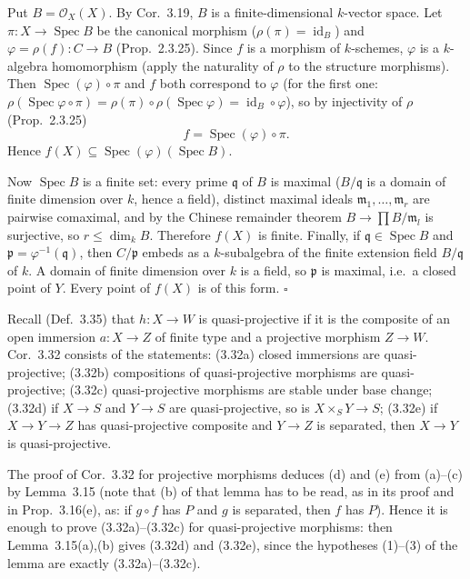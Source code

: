 \documentclass[11pt]{article}
\begin{document}
Put $B=\mathcal{O}_X(X)$. By Cor.~3.19, $B$ is a finite-dimensional $k$-vector space. Let $\pi:X\to\operatorname{Spec}B$ be the canonical morphism ($\rho(\pi)=\operatorname{id}_B$) and $\varphi=\rho(f):C\to B$ (Prop.~2.3.25). Since $f$ is a morphism of $k$-schemes, $\varphi$ is a $k$-algebra homomorphism (apply the naturality of $\rho$ to the structure morphisms). Then $\operatorname{Spec}(\varphi)\circ\pi$ and $f$ both correspond to $\varphi$ (for the first one: $\rho(\operatorname{Spec}\varphi\circ\pi)=\rho(\pi)\circ\rho(\operatorname{Spec}\varphi)=\operatorname{id}_B\circ\varphi$), so by injectivity of $\rho$ (Prop.~2.3.25)
\[ f=\operatorname{Spec}(\varphi)\circ\pi. \]
Hence $f(X)\subseteq\operatorname{Spec}(\varphi)(\operatorname{Spec}B)$.

Now $\operatorname{Spec}B$ is a finite set: every prime $\mathfrak q$ of $B$ is maximal ($B/\mathfrak q$ is a domain of finite dimension over $k$, hence a field), distinct maximal ideals $\mathfrak m_1,\dots,\mathfrak m_r$ are pairwise comaximal, and by the Chinese remainder theorem $B\to\prod B/\mathfrak m_l$ is surjective, so $r\le\dim_kB$. Therefore $f(X)$ is finite. Finally, if $\mathfrak q\in\operatorname{Spec}B$ and $\mathfrak p=\varphi^{-1}(\mathfrak q)$, then $C/\mathfrak p$ embeds as a $k$-subalgebra of the finite extension field $B/\mathfrak q$ of $k$. A domain of finite dimension over $k$ is a field, so $\mathfrak p$ is maximal, i.e.\ a closed point of $Y$. Every point of $f(X)$ is of this form. \hfill$\square$

\pf
Recall (Def.~3.35) that $h:X\to W$ is quasi-projective if it is the composite of an open immersion $a:X\to Z$ of finite type and a projective morphism $Z\to W$. Cor.~3.32 consists of the statements: (3.32a) closed immersions are quasi-projective; (3.32b) compositions of quasi-projective morphisms are quasi-projective; (3.32c) quasi-projective morphisms are stable under base change; (3.32d) if $X\to S$ and $Y\to S$ are quasi-projective, so is $X\times_SY\to S$; (3.32e) if $X\to Y\to Z$ has quasi-projective composite and $Y\to Z$ is separated, then $X\to Y$ is quasi-projective.

The proof of Cor.~3.32 for projective morphisms deduces (d) and (e) from (a)--(c) by Lemma~3.15 (note that (b) of that lemma has to be read, as in its proof and in Prop.~3.16(e), as: if $g\circ f$ has $P$ and $g$ is separated, then $f$ has $P$). Hence it is enough to prove (3.32a)--(3.32c) for quasi-projective morphisms: then Lemma~3.15(a),(b) gives (3.32d) and (3.32e), since the hypotheses (1)--(3) of the lemma are exactly (3.32a)--(3.32c).
\end{document}
